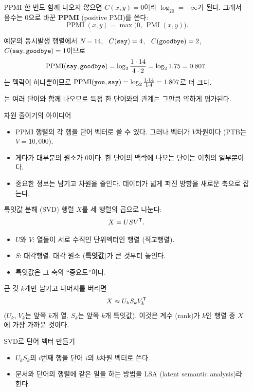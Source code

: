 \documentclass[aspectratio=169,11pt]{beamer}
\begin{document}
\begin{frame}{PPMI}
한 번도 함께 나오지 않으면 $C(x,y)=0$이라 $\log_20=-\infty$가 된다.
그래서 음수는 $0$으로 바꾼 \textbf{PPMI} (positive PMI)를 쓴다:
\[
\operatorname{PPMI}(x,y)=\max\big(0,\ \operatorname{PMI}(x,y)\big).
\]
\begin{keybox}
예문의 동시발생 행렬에서
$N=14$, \ $C(\texttt{say})=4$, \ $C(\texttt{goodbye})=2$, \ $C(\texttt{say},\texttt{goodbye})=1$이므로
\[
\operatorname{PPMI}(\texttt{say},\texttt{goodbye})=\log_2\frac{1\cdot14}{4\cdot2}=\log_21.75=0.807 .
\]
는 맥락이  하나뿐이므로
$\operatorname{PPMI}(\texttt{you},\texttt{say})=\log_2\frac{1\cdot14}{1\cdot4}=1.807$로 더 크다.
\end{keybox}
는 여러 단어와 함께 나오므로 특정 한 단어와의 관계는 그만큼 약하게 평가된다.
\end{frame}

\begin{frame}{차원 줄이기의 아이디어}
\begin{itemize}
\item PPMI 행렬의 각 행을 단어 벡터로 쓸 수 있다. 그러나 벡터가 $V$차원이다 (PTB는 $V=10{,}000$).
\item 게다가 대부분의 원소가 $0$이다. 한 단어의 맥락에 나오는 단어는 어휘의 일부뿐이다.
\item 중요한 정보는 남기고 차원을 줄인다. 데이터가 넓게 퍼진 방향을 새로운 축으로 잡는다.
\end{itemize}
\end{frame}

\begin{frame}{특잇값 분해 (SVD)}
행렬 $X$를 세 행렬의 곱으로 나눈다:
\[
X=USV^{\mathsf T} .
\]
\begin{itemize}
\item $U$와 $V$: 열들이 서로 수직인 단위벡터인 행렬 (직교행렬).
\item $S$: 대각행렬. 대각 원소 (\textbf{특잇값})가 큰 것부터 놓인다.
\item 특잇값은 그 축의 ``중요도''이다.
\end{itemize}
큰 것 $k$개만 남기고 나머지를 버리면
\[
X\approx U_kS_kV_k^{\mathsf T}
\]
($U_k$, $V_k$는 앞쪽 $k$개 열, $S_k$는 앞쪽 $k$개 특잇값).
이것은 계수 (rank)가 $k$인 행렬 중 $X$에 가장 가까운 것이다.
\end{frame}

\begin{frame}{SVD로 단어 벡터 만들기}
\vskip2mm
\begin{itemize}
\item $U_kS_k$의 $i$번째 행을 단어 $i$의 $k$차원 벡터로 쓴다.
\item 문서와 단어의 행렬에 같은 일을 하는 방법을 LSA (latent semantic analysis)라 한다.
\end{itemize}
\end{frame}
\end{document}
